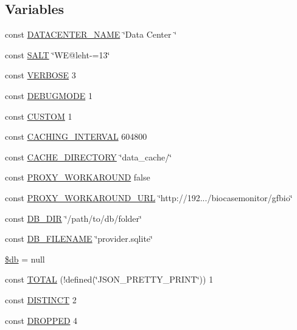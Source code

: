 \subsection*{Variables}
\begin{DoxyCompactItemize}
\item 
const \hyperlink{namespace_bms_a28e24c389e469e22acd9d33abfe3fb4d}{D\+A\+T\+A\+C\+E\+N\+T\+E\+R\+\_\+\+N\+A\+ME} \char`\"{}Data Center \char`\"{}
\item 
const \hyperlink{namespace_bms_a6d448b74f10f8080293b329a47a046b4}{S\+A\+LT} \char`\"{}WE@leht-\/=13\char`\"{}
\item 
const \hyperlink{namespace_bms_af070310b6692d4e96af677af14648411}{V\+E\+R\+B\+O\+SE} 3
\item 
const \hyperlink{namespace_bms_a7af7ef3e15183adae80bfc7cf0272937}{D\+E\+B\+U\+G\+M\+O\+DE} 1
\item 
const \hyperlink{namespace_bms_a4b14ca0fbcdfa3f37da752304008a9c1}{C\+U\+S\+T\+OM} 1
\item 
const \hyperlink{namespace_bms_ac3ff4673172a882fa4a11351118e2716}{C\+A\+C\+H\+I\+N\+G\+\_\+\+I\+N\+T\+E\+R\+V\+AL} 604800
\item 
const \hyperlink{namespace_bms_a43e84be6597c73c02e67db0dc944cd1a}{C\+A\+C\+H\+E\+\_\+\+D\+I\+R\+E\+C\+T\+O\+RY} \char`\"{}data\+\_\+cache/\char`\"{}
\item 
const \hyperlink{namespace_bms_a83815bb64763ef7810008cfe96d0ecf7}{P\+R\+O\+X\+Y\+\_\+\+W\+O\+R\+K\+A\+R\+O\+U\+ND} false
\item 
const \hyperlink{namespace_bms_a796fca3489760c39de0d4efdd11c67de}{P\+R\+O\+X\+Y\+\_\+\+W\+O\+R\+K\+A\+R\+O\+U\+N\+D\+\_\+\+U\+RL} \char`\"{}http\+://192.../biocasemonitor/gfbio\char`\"{}
\item 
const \hyperlink{namespace_bms_a525a6614ba9af7ba1f60bb7e60572a0c}{D\+B\+\_\+\+D\+IR} \char`\"{}/path/to/db/folder\char`\"{}
\item 
const \hyperlink{namespace_bms_abc05b2c0a077204fb0ef0f345a8f006f}{D\+B\+\_\+\+F\+I\+L\+E\+N\+A\+ME} \char`\"{}provider.\+sqlite\char`\"{}
\item 
\hyperlink{namespace_bms_a1fa3127fc82f96b1436d871ef02be319}{\$db} = null
\item 
const \hyperlink{namespace_bms_ad080a43f212802d39f67f19feeb26dfe}{T\+O\+T\+AL} (!defined(\char`\"{}J\+S\+O\+N\+\_\+\+P\+R\+E\+T\+T\+Y\+\_\+\+P\+R\+I\+NT\char`\"{})) 1
\item 
const \hyperlink{namespace_bms_a99cb80c249c1d51aa36375cca5921896}{D\+I\+S\+T\+I\+N\+CT} 2
\item 
const \hyperlink{namespace_bms_ac8aa145c99391c64083d1ab9451eedef}{D\+R\+O\+P\+P\+ED} 4
\end{DoxyCompactItemize}


